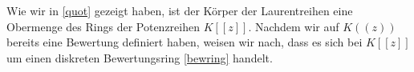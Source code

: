 Wie wir in \ref{quot} gezeigt haben, ist der Körper der Laurentreihen eine Obermenge des Rings der Potenzreihen $K[[z]]$. Nachdem wir auf $K((z))$ bereits eine Bewertung definiert haben, weisen wir nach, dass es sich bei $K[[z]]$ um einen diskreten Bewertungsring \ref{bewring} handelt. 

